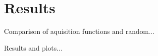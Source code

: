 \documentclass[12pt,fleqn]{article}
\begin{document}
\section{Results}
Comparison of aquisition functions and random...

Results and plots...
\begin{comment}
	Results of using baysian optimization with acquisition MPI: \\
	${hidden units: 3500, p: 0.4423657706097197, activation func: Sigmoid(), validation loss: 0.6415}$
	${hidden units: 600, p: 0.05357242679336405, activation func: ReLU(), validation loss: 0.6135}$
	${hidden units: 800, p: 0.024286531237800668, activation func: Sigmoid(), validation loss: 0.624}$
	${hidden units: 900, p: 0.5359999678433617, activation func: Tanh(), validation loss: 0.621}$
	${hidden units: 900, p: 0.6064720199905345, activation func: Tanh(), validation loss: 0.6215}$
	${hidden units: 3500, p: 0.28760052084452836, activation func: Sigmoid(), validation loss: 0.639}$
	${hidden units: 3500, p: 0.4812338027466384, activation func: Sigmoid(), validation loss: 0.649}$
	${hidden units: 3500, p: 0.598166666688632, activation func: Sigmoid(), validation loss: 0.654}$
	${hidden units: 3500, p: 0.7073019913319729, activation func: Sigmoid(), validation loss: 0.635}$
	${hidden units: 3500, p: 0.6366823572272423, activation func: Sigmoid(), validation loss: 0.6455}$
	${hidden units: 3500, p: 0.7208836418636946, activation func: Sigmoid(), validation loss: 0.6425}$
	${hidden units: 3500, p: 0.8135979227010048, activation func: Sigmoid(), validation loss: 0.6045}$
	${hidden units: 3500, p: 0.5757959667629431, activation func: Sigmoid(), validation loss: 0.6535}$
	${hidden units: 3500, p: 0.5577435983137187, activation func: Sigmoid(), validation loss: 0.6535}$
	${hidden units: 3500, p: 0.4119006857770867, activation func: Sigmoid(), validation loss: 0.6295000000000001}$
	$bedste:  [3.5000000e+03 2.8204313e-01 3.0000000e+00]$
	

\end{comment}
\end{document}
